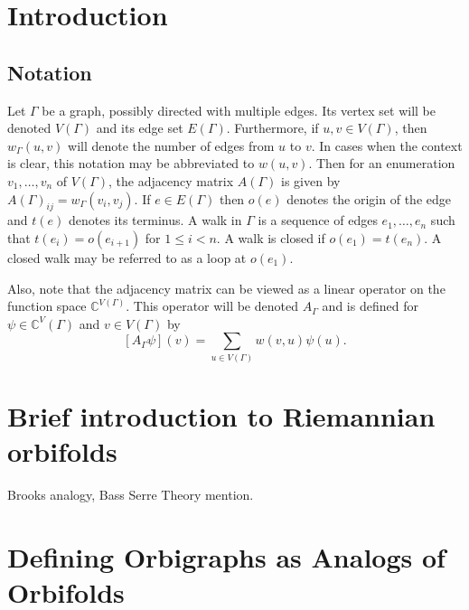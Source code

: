 \documentclass[12pt]{article}
\theoremstyle{plain}
\theoremstyle{definition}
\theoremstyle{remark}
\begin{document}
\section{Introduction}


  

  \subsection{Notation}
  Let $\Gamma$ be a graph, possibly directed with multiple edges. Its vertex set will be denoted $V(\Gamma)$ and its edge set $E(\Gamma)$. Furthermore, if $u, v \in V(\Gamma)$, then $w_\Gamma(u, v)$ will denote the number of edges from $u$ to $v$. In cases when the context is clear, this notation may be abbreviated to $w(u,v)$. Then for an enumeration $v_1, \ldots, v_n$ of $V(\Gamma)$, the adjacency matrix $A(\Gamma)$ is given by $A(\Gamma)_{ij} = w_\Gamma(v_i, v_j)$. If $e \in E(\Gamma)$ then $o(e)$ denotes the origin of the edge and $t(e)$ denotes its terminus. A walk in $\Gamma$ is a sequence of edges $e_1,\ldots,e_n$ such that $t(e_i) = o(e_{i+1})$ for $1 \le i < n$. A walk is closed if $o(e_1) = t(e_n)$. A closed walk may be referred to as a loop at $o(e_1)$.

  Also, note that the adjacency matrix can be viewed as a linear operator on the function space $\mathbb{C}^{V(\Gamma)}$. This operator will be denoted $A_\Gamma$ and is defined for $\psi \in \mathbb{C}^V(\Gamma)$ and $v \in V(\Gamma)$ by
  $$
    [A_\Gamma \psi](v) = \sum_{u \in V(\Gamma)} w(v, u)\psi(u).
  $$


\section{Brief introduction to Riemannian orbifolds}

  Brooks analogy, Bass Serre Theory mention.


\section{Defining Orbigraphs as Analogs of Orbifolds}
\end{document}
